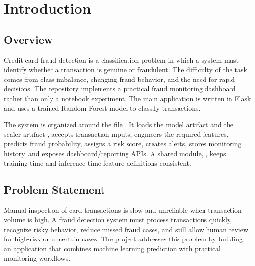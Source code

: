 \documentclass[12pt,a4paper]{report}
\begin{document}
\newpage

\tableofcontents
\newpage

\begingroup
\makeatletter
\let\addvspace\@gobble
\makeatother
\listoffigures
\endgroup
\newpage

\begingroup
\makeatletter
\let\addvspace\@gobble
\makeatother
\listoftables
\endgroup
\newpage

\setcounter{page}{1}
\pagestyle{fancy}
\fancyhf{}
\fancyhead[L]{\nouppercase{\leftmark}}
\fancyfoot[C]{\thepage}
\renewcommand{\headrulewidth}{0.4pt}
\fancypagestyle{plain}{
    \fancyhf{}
    \fancyfoot[C]{\thepage}
    \renewcommand{\headrulewidth}{0pt}
}

\chapter{Introduction}

\section{Overview}
Credit card fraud detection is a classification problem in which a system must identify whether a transaction is genuine or fraudulent. The difficulty of the task comes from class imbalance, changing fraud behavior, and the need for rapid decisions. The repository implements a practical fraud monitoring dashboard rather than only a notebook experiment. The main application is written in Flask and uses a trained Random Forest model to classify transactions.

The system is organized around the file . It loads the model artifact  and the scaler artifact , accepts transaction inputs, engineers the required features, predicts fraud probability, assigns a risk score, creates alerts, stores monitoring history, and exposes dashboard/reporting APIs. A shared module, , keeps training-time and inference-time feature definitions consistent.

\section{Problem Statement}
Manual inspection of card transactions is slow and unreliable when transaction volume is high. A fraud detection system must process transactions quickly, recognize risky behavior, reduce missed fraud cases, and still allow human review for high-risk or uncertain cases. The project addresses this problem by building an application that combines machine learning prediction with practical monitoring workflows.
\end{document}
